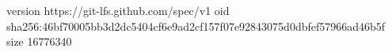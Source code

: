version https://git-lfs.github.com/spec/v1
oid sha256:46bf70005bb3d2dc5404cf6e9ad2cf157f07e92843075d0dbfef57966ad46b5f
size 16776340
